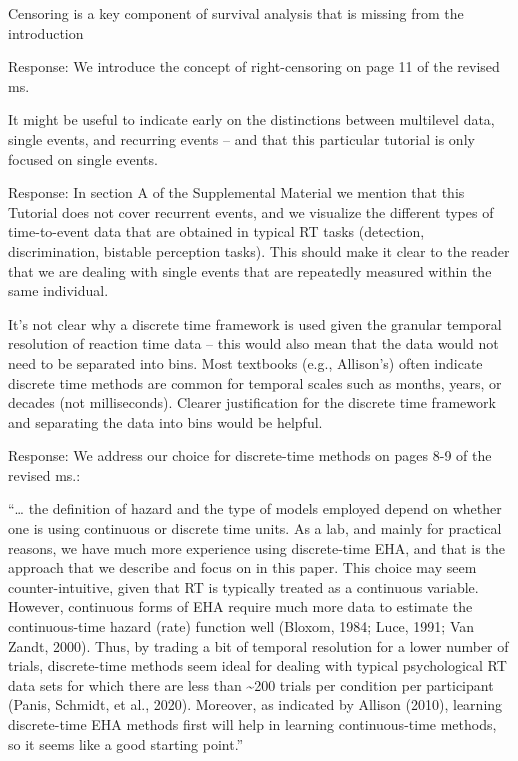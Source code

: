 \documentclass[
]{article}
\renewenvironment{quote}{\begin{leftbar}}{\end{leftbar}}
\begin{document}
\begin{quote}
Censoring is a key component of survival analysis that is missing from
the introduction
\end{quote}

Response: We introduce the concept of right-censoring on page 11 of the
revised ms.

\begin{quote}
It might be useful to indicate early on the distinctions between
multilevel data, single events, and recurring events -- and that this
particular tutorial is only focused on single events.
\end{quote}

Response: In section A of the Supplemental Material we mention that this
Tutorial does not cover recurrent events, and we visualize the different
types of time-to-event data that are obtained in typical RT tasks
(detection, discrimination, bistable perception tasks). This should make
it clear to the reader that we are dealing with single events that are
repeatedly measured within the same individual.

\begin{quote}
It's not clear why a discrete time framework is used given the granular
temporal resolution of reaction time data -- this would also mean that
the data would not need to be separated into bins. Most textbooks (e.g.,
Allison's) often indicate discrete time methods are common for temporal
scales such as months, years, or decades (not milliseconds). Clearer
justification for the discrete time framework and separating the data
into bins would be helpful.
\end{quote}

Response: We address our choice for discrete-time methods on pages 8-9
of the revised ms.:

``\ldots{} the definition of hazard and the type of models employed
depend on whether one is using continuous or discrete time units. As a
lab, and mainly for practical reasons, we have much more experience
using discrete-time EHA, and that is the approach that we describe and
focus on in this paper. This choice may seem counter-intuitive, given
that RT is typically treated as a continuous variable. However,
continuous forms of EHA require much more data to estimate the
continuous-time hazard (rate) function well (Bloxom, 1984; Luce, 1991;
Van Zandt, 2000). Thus, by trading a bit of temporal resolution for a
lower number of trials, discrete-time methods seem ideal for dealing
with typical psychological RT data sets for which there are less than
\textasciitilde200 trials per condition per participant (Panis, Schmidt,
et al., 2020). Moreover, as indicated by Allison (2010), learning
discrete-time EHA methods first will help in learning continuous-time
methods, so it seems like a good starting point.''
\end{document}
